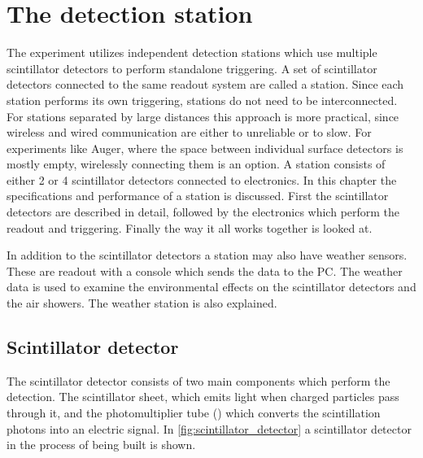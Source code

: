 \setcounter{chapter}{1}
\chapter{The \hisparc detection station}

The \hisparc experiment utilizes independent detection stations which use multiple scintillator detectors to perform standalone triggering. A set of scintillator detectors connected to the same readout system are called a station. Since each station performs its own triggering, stations do not need to be interconnected. For stations separated by large distances this approach is more practical, since wireless and wired communication are either to unreliable or to slow. For experiments like Auger, where the space between individual surface detectors is mostly empty, wirelessly connecting them is an option. A \hisparc station consists of either 2 or 4 scintillator detectors connected to \hisparc electronics. In this chapter the specifications and performance of a station is discussed. First the scintillator detectors are described in detail, followed by the electronics which perform the readout and triggering. Finally the way it all works together is looked at.

In addition to the scintillator detectors a station may also have weather sensors. These are readout with a console which sends the data to the PC. The weather data is used to examine the environmental effects on the scintillator detectors and the air showers. The weather station is also explained.


\section{Scintillator detector}

The scintillator detector consists of two main components which perform the detection. The scintillator sheet, which emits light when charged particles pass through it, and the photomultiplier tube (\pmt) which converts the scintillation photons into an electric signal. In \cref{fig:scintillator_detector} a scintillator detector in the process of being built is shown.

